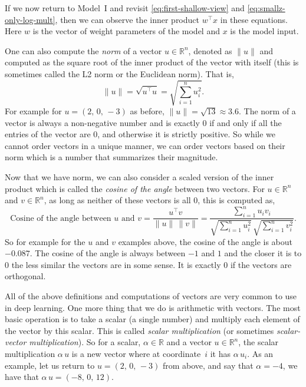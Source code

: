 If we now return to Model~I and revisit \eqref{eq:first-shallow-view} and \eqref{eq:smallz-only-log-mult}, then we can observe the inner product $w^\top x$ in these equations. Here $w$ is the vector of weight parameters of the model and $x$ is the model input.

One can also compute the {\em norm}  of a vector $u \in {\mathbb R}^n$, denoted as $\| u\|$ and computed as the square root of the inner product of the vector with itself (this is sometimes called the L2 norm or the Euclidean norm). That is,
%
\begin{equation}
\label{eq:norm-vec}
\| u \| = \sqrt{u^\top u} = \sqrt{\sum_{i=1}^n u_i^2}.
\end{equation}
%
For example for $u=(2, \, 0,\, -3)$ as before, $\| u \| = \sqrt{13} \approx 3.6$. The norm of a vector is always a non-negative number and is exactly $0$ if and only if all the entries of the vector are $0$, and otherwise it is strictly positive. So while we cannot order vectors in a unique manner, we can order vectors based on their norm which is a number  that summarizes their magnitude. 

Now that we have norm, we can also consider a scaled version of the inner product which is called the {\em cosine of the angle} between two vectors. For $u \in {\mathbb R}^n$ and $v \in {\mathbb R}^n$, as long as neither of these vectors is all $0$, this is computed as,
%
\begin{equation}
\label{eq:cosine-angle-vec}
\textrm{Cosine of the angle between $u$ and $v$} = \frac{u^\top v}{\|u \|\, \|v\|} = \frac{\sum_{i=1}^n u_i v_i}{\sqrt{\sum_{i=1}^n u_i^2} \, \sqrt{\sum_{i=1}^n v_i^2 }}.
\end{equation}
%
So for example for the $u$ and $v$ examples above, the cosine of the angle is about $-0.087$. The cosine of the angle is always between $-1$ and $1$ and the closer it is to $0$ the less similar the vectors are in some sense. It is exactly $0$ if the vectors are orthogonal.

All of the above definitions and computations of vectors are very common to use in deep learning. One more thing that we do is arithmetic with vectors. The most basic operation is to take a scalar (a single number) and multiply each element of the vector by this scalar. This is called {\em scalar multiplication} (or sometimes {\em scalar-vector multiplication}). So for a scalar, $\alpha \in {\mathbb R}$ and a vector $u \in {\mathbb R}^n$, the scalar multiplication $\alpha \, u$ is a new vector where at coordinate~$i$ it has $\alpha \, u_i$. As an example, let us return to $u=(2,\,0,\,-3)$ from above, and say that $\alpha = -4$, we have that $\alpha \, u = (-8, \,0,\, 12)$.


